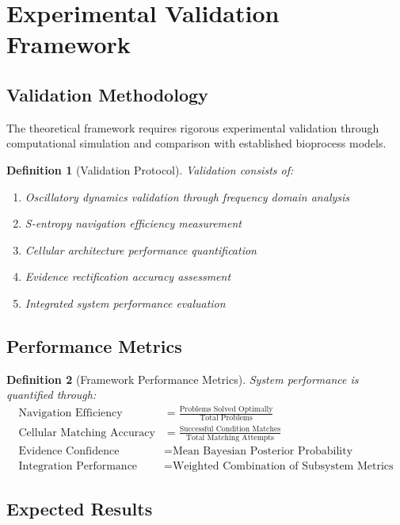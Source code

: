\documentclass[12pt,a4paper]{article}
\newtheorem{definition}{Definition}
\begin{document}
\section{Experimental Validation Framework}

\subsection{Validation Methodology}

The theoretical framework requires rigorous experimental validation through computational simulation and comparison with established bioprocess models.

\begin{definition}[Validation Protocol]
Validation consists of:
\begin{enumerate}
\item Oscillatory dynamics validation through frequency domain analysis
\item S-entropy navigation efficiency measurement
\item Cellular architecture performance quantification
\item Evidence rectification accuracy assessment
\item Integrated system performance evaluation
\end{enumerate}
\end{definition}

\subsection{Performance Metrics}

\begin{definition}[Framework Performance Metrics]
System performance is quantified through:
\begin{align}
\text{Navigation Efficiency} &= \frac{\text{Problems Solved Optimally}}{\text{Total Problems}} \\
\text{Cellular Matching Accuracy} &= \frac{\text{Successful Condition Matches}}{\text{Total Matching Attempts}} \\
\text{Evidence Confidence} &= \text{Mean Bayesian Posterior Probability} \\
\text{Integration Performance} &= \text{Weighted Combination of Subsystem Metrics}
\end{align}
\end{definition}

\subsection{Expected Results}
\end{document}
